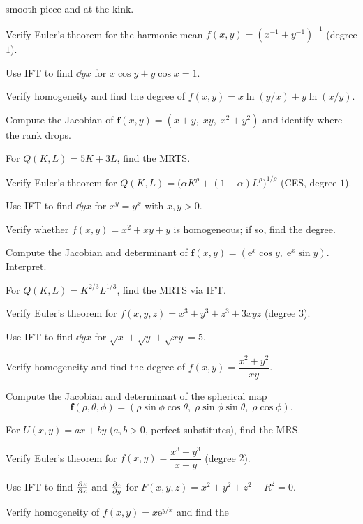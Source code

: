 \begin{problems}
        smooth piece and at the kink.
  \item Verify Euler's theorem for the harmonic mean
        $f(x,y)=(x^{-1}+y^{-1})^{-1}$ (degree $1$).
  \item Use IFT to find $\dd{y}{x}$ for $x\cos y+y\cos x=1$.
  \item Verify homogeneity and find the degree of
        $f(x,y)=x\ln(y/x)+y\ln(x/y)$.
  \item Compute the Jacobian of
        $\mathbf{f}(x,y)=(x+y,\;xy,\;x^{2}+y^{2})$ and identify where the
        rank drops.
  \item For $Q(K,L)=5K+3L$, find the MRTS.
  \item Verify Euler's theorem for
        $Q(K,L)=\bigl(\alpha K^{\rho}+(1-\alpha)L^{\rho}\bigr)^{1/\rho}$
        (CES, degree $1$).
  \item Use IFT to find $\dd{y}{x}$ for $x^{y}=y^{x}$ with $x,y>0$.
  \item Verify whether $f(x,y)=x^{2}+xy+y$ is homogeneous; if so, find the
        degree.
  \item Compute the Jacobian and determinant of
        $\mathbf{f}(x,y)=(\mathrm{e}^{x}\cos y,\;\mathrm{e}^{x}\sin y)$.
        Interpret.
  \item For $Q(K,L)=K^{2/3}L^{1/3}$, find the MRTS via IFT.
  \item Verify Euler's theorem for $f(x,y,z)=x^{3}+y^{3}+z^{3}+3xyz$
        (degree $3$).
  \item Use IFT to find $\dd{y}{x}$ for $\sqrt{x}+\sqrt{y}+\sqrt{xy}=5$.
  \item Verify homogeneity and find the degree of
        $f(x,y)=\dfrac{x^{2}+y^{2}}{xy}$.
  \item Compute the Jacobian and determinant of the spherical map
        \[
          \mathbf{f}(\rho,\theta,\phi)=(\rho\sin\phi\cos\theta,\;
          \rho\sin\phi\sin\theta,\;\rho\cos\phi).
        \]
  \item For $U(x,y)=ax+by$ ($a,b>0$, perfect substitutes), find the MRS.
  \item Verify Euler's theorem for $f(x,y)=\dfrac{x^{3}+y^{3}}{x+y}$
        (degree $2$).
  \item Use IFT to find $\frac{\partial z}{\partial x}$ and $\frac{\partial z}{\partial y}$ for
        $F(x,y,z)=x^{2}+y^{2}+z^{2}-R^{2}=0$.
  \item Verify homogeneity of $f(x,y)=x\mathrm{e}^{y/x}$ and find the

\end{problems}
